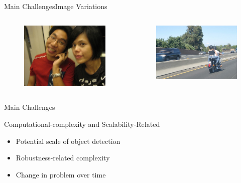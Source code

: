 \begin{frame}{Main Challenges}{Image Variations}
\begin{columns}
        \begin{figure}
            \includegraphics[width=0.7 \textwidth]{figs/000323.jpg}
        \end{figure}
        \begin{figure}
            \includegraphics[width=0.7 \textwidth]{figs/000579.jpg}
        \end{figure}

    \end{columns}
\end{frame}

\begin{frame}{Main Challenges}{}
        \begin{block}{Computational-complexity and Scalability-Related}
        \begin{itemize}
            \item Potential scale of object detection
            \item Robustness-related complexity
            \item Change in problem over time
        \end{itemize}
            

        \end{block}
\end{frame}

